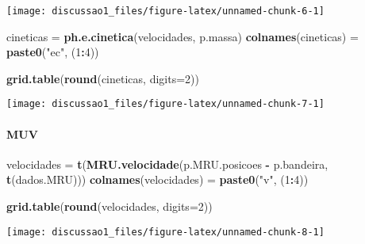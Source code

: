 \documentclass[]{article}
\newenvironment{Shaded}{\begin{snugshade}}{\end{snugshade}}
\newcommand{\KeywordTok}[1]{\textcolor[rgb]{0.13,0.29,0.53}{\textbf{#1}}}
\newcommand{\DataTypeTok}[1]{\textcolor[rgb]{0.13,0.29,0.53}{#1}}
\newcommand{\DecValTok}[1]{\textcolor[rgb]{0.00,0.00,0.81}{#1}}
\newcommand{\StringTok}[1]{\textcolor[rgb]{0.31,0.60,0.02}{#1}}
\newcommand{\OperatorTok}[1]{\textcolor[rgb]{0.81,0.36,0.00}{\textbf{#1}}}
\newcommand{\NormalTok}[1]{#1}
\let\oldparagraph\paragraph
\renewcommand{\paragraph}[1]{\oldparagraph{#1}\mbox{}}
\begin{document}
\begin{flushleft}\texttt{[image: discussao1\_files/figure-latex/unnamed-chunk-6-1]} \end{flushleft}

\begin{Shaded}
\begin{Highlighting}[]
\NormalTok{cineticas =}\StringTok{ }\KeywordTok{ph.e.cinetica}\NormalTok{(velocidades, p.massa)}
\KeywordTok{colnames}\NormalTok{(cineticas) =}\StringTok{ }\KeywordTok{paste0}\NormalTok{(}\StringTok{"ec"}\NormalTok{, (}\DecValTok{1}\OperatorTok{:}\DecValTok{4}\NormalTok{))}

\KeywordTok{grid.table}\NormalTok{(}\KeywordTok{round}\NormalTok{(cineticas, }\DataTypeTok{digits=}\DecValTok{2}\NormalTok{))}
\end{Highlighting}
\end{Shaded}

\begin{flushleft}\texttt{[image: discussao1\_files/figure-latex/unnamed-chunk-7-1]} \end{flushleft}

\paragraph{MUV}\label{muv}

\begin{Shaded}
\begin{Highlighting}[]
\NormalTok{velocidades =}\StringTok{ }\KeywordTok{t}\NormalTok{(}\KeywordTok{MRU.velocidade}\NormalTok{(p.MRU.posicoes }\OperatorTok{-}\StringTok{ }\NormalTok{p.bandeira, }\KeywordTok{t}\NormalTok{(dados.MRU)))}
\KeywordTok{colnames}\NormalTok{(velocidades) =}\StringTok{ }\KeywordTok{paste0}\NormalTok{(}\StringTok{"v"}\NormalTok{, (}\DecValTok{1}\OperatorTok{:}\DecValTok{4}\NormalTok{))}

\KeywordTok{grid.table}\NormalTok{(}\KeywordTok{round}\NormalTok{(velocidades, }\DataTypeTok{digits=}\DecValTok{2}\NormalTok{))}
\end{Highlighting}
\end{Shaded}

\begin{flushleft}\texttt{[image: discussao1\_files/figure-latex/unnamed-chunk-8-1]} \end{flushleft}
\end{document}
